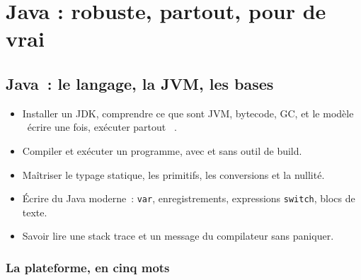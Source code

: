\documentclass[12pt,a4paper,twoside,openright]{book}
\begin{document}
\part{Java : robuste, partout, pour de vrai}
\chapter{Java~: le langage, la JVM, les bases}
\label{ch-java-bases}

\begin{objectif}
\begin{itemize}
  \item Installer un JDK, comprendre ce que sont JVM, bytecode, GC, et le mod\`ele \og ~\'ecrire une fois,
        ex\'ecuter partout~ \fg{}.
  \item Compiler et ex\'ecuter un programme, avec et sans outil de build.
  \item Ma\^itriser le typage statique, les primitifs, les conversions et la nullit\'e.
  \item \'Ecrire du Java moderne~: \verb|var|, enregistrements, expressions \verb|switch|, blocs de texte.
  \item Savoir lire une stack trace et un message du compilateur sans paniquer.
\end{itemize}
\end{objectif}

\section{La plateforme, en cinq mots}
\end{document}
